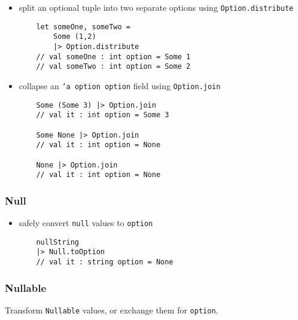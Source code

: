 \documentclass{article}
\begin{document}
\begin{itemize}
\item split an optional tuple into two separate options using \texttt{Option.distribute}
\begin{verbatim}
    let someOne, someTwo =
        Some (1,2)
        |> Option.distribute
    // val someOne : int option = Some 1
    // val someTwo : int option = Some 2
\end{verbatim}

\item collapse an \texttt{'a option option} field using \texttt{Option.join}
\begin{verbatim}
    Some (Some 3) |> Option.join
    // val it : int option = Some 3
    
    Some None |> Option.join
    // val it : int option = None
    
    None |> Option.join
    // val it : int option = None
\end{verbatim}

\end{itemize}

\subsubsection{Null}

\begin{itemize}

\item safely convert \texttt{null} values to \texttt{option}
\begin{verbatim}
    nullString
    |> Null.toOption
    // val it : string option = None
\end{verbatim}

\end{itemize}

\subsubsection{Nullable}

Transform \texttt{Nullable} values, or exchange them for \texttt{option}.
\end{document}
